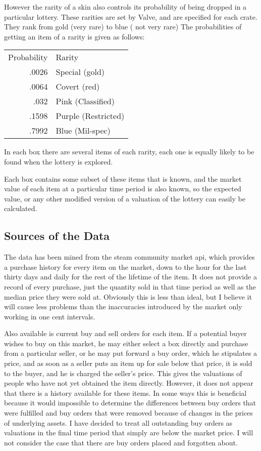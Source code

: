 \documentclass[11pt]{article}
\begin{document}
However the rarity of a skin also controls its probability of being
dropped in a particular lottery. These rarities are set by Valve, and
are specified for each crate. They rank from gold (very rare) to blue
( not very rare)
The probabilities of getting an item of a rarity is given as follows:
\begin{center}
\begin{tabular}{rl}
Probability & Rarity\\
.0026 & Special (gold)\\
.0064 & Covert (red)\\
.032 & Pink (Classified)\\
.1598 & Purple (Restricted)\\
.7992 & Blue (Mil-spec)\\
\end{tabular}
\end{center}
In each box there are several items of each rarity, each one is
equally likely to be found when the lottery is explored. 

Each box contains some subset of these items that is known, and the
market value of each item at a particular time period is also known,
so the expected value, or any other modified version of a valuation of
the lottery can easily be calculated. 

\subsection{Sources of the Data}
\label{sec-3-2}
The data has been mined from the steam community market api, which
provides a purchase history for every item on the market, down to the
hour for the last thirty days and daily for the rest of the lifetime
of the item. It does not provide a record of every purchase, just the
quantity sold in that time period as well as the median price they
were sold at. Obviously this is less than ideal, but I believe it will
cause less problems than the inaccuracies introduced by the market only
working in one cent intervals.

Also available is current buy and sell orders for each item. If a
potential buyer wishes to buy on this market, he may either select a
box directly and purchase from a particular seller, or he may put
forward a buy order, which he stipulates a price, and as soon as a
seller puts an item up for sale below that price, it is sold to the
buyer, and he is charged the seller's price. This gives the
valuations of people who have not yet obtained the item directly.
However, it does not appear that there is a history available for
these items. In some ways this is beneficial because it would
impossible to determine the differences between buy orders that were
fulfilled and buy orders that were removed because of changes in the
prices of underlying assets. I have decided to treat all outstanding
buy orders as valuations in the final time period that simply are
below the market price. I will not consider the case that there are
buy orders placed and forgotten about.
\end{document}
